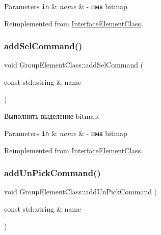 \begin{DoxyParams}[1]{Parameters}
\mbox{\tt in}  & {\em name} & -\/ имя bitmap \\
\hline
\end{DoxyParams}


Reimplemented from \hyperlink{class_interface_element_class_af1061f10847c0c30a5815e64892e8d60}{Interface\+Element\+Class}.

\mbox{\label{class_group_element_class_a09a79779143779b0c6e5088bbdbed8ca}} 
\subsubsection{\texorpdfstring{add\+Sel\+Command()}{addSelCommand()}}
{\footnotesize\ttfamily void Group\+Element\+Class\+::add\+Sel\+Command (\begin{DoxyParamCaption}\item[{const std\+::string \&}]{name }\end{DoxyParamCaption})\hspace{0.3cm}{\ttfamily [virtual]}}



Выполнить выделение bitmap. 


\begin{DoxyParams}[1]{Parameters}
\mbox{\tt in}  & {\em name} & -\/ имя bitmap \\
\hline
\end{DoxyParams}


Reimplemented from \hyperlink{class_interface_element_class_a47b6374245f1b3a2c56366b8819f1569}{Interface\+Element\+Class}.

\mbox{\label{class_group_element_class_a253deff7c95f9311405dc99ba0ffe7c2}} 
\subsubsection{\texorpdfstring{add\+Un\+Pick\+Command()}{addUnPickCommand()}}
{\footnotesize\ttfamily void Group\+Element\+Class\+::add\+Un\+Pick\+Command (\begin{DoxyParamCaption}\item[{const std\+::string \&}]{name }\end{DoxyParamCaption})\hspace{0.3cm}{\ttfamily [virtual]}}



